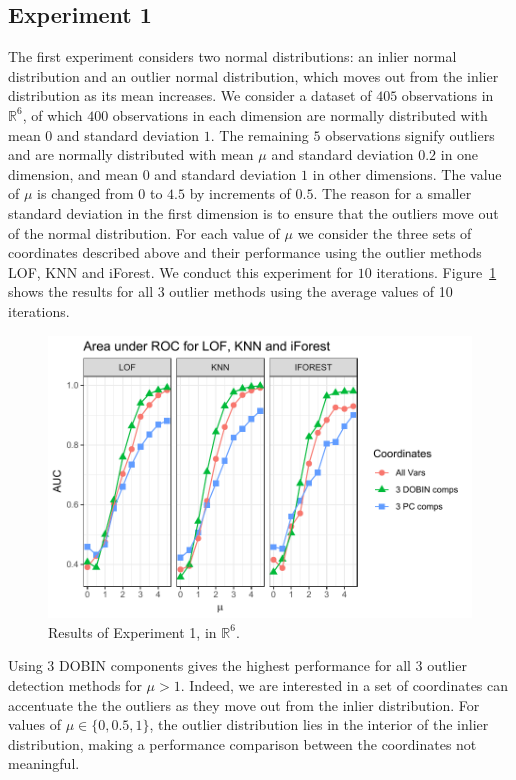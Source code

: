 \documentclass[11pt]{article}
\begin{document}
\subsection{Experiment 1}
The first experiment considers two normal distributions: an  inlier normal distribution and an outlier normal distribution, which moves out from the inlier distribution as its mean increases. We consider a dataset of $405$ observations in $\mathbb{R}^6$, of which $400$ observations in each dimension are normally distributed with mean $0$ and standard deviation $1$. The remaining $5$ observations signify outliers and are normally distributed with mean $\mu$ and standard deviation $0.2$ in one dimension, and mean $0$ and standard deviation $1$ in other dimensions. The value of $\mu$ is changed from $0$ to $4.5$ by increments of $0.5$. The reason for a smaller standard deviation in the first dimension is to ensure that the outliers move out of the normal distribution. For each value of $\mu$ we consider the three sets of coordinates described above and their performance using the outlier methods LOF, KNN and iForest.  We conduct this experiment for $10$ iterations. Figure~\ref{fig:Exp1} shows the results for all $3$  outlier methods using the average values of  10 iterations. 

\begin{figure}
	\centering
	\includegraphics[scale=0.8]{Exp1.pdf}
	\caption{Results of Experiment 1, in $\mathbb{R}^6$.}
	\label{fig:Exp1}
\end{figure} 

Using $3$ DOBIN components gives the highest performance for all $3$ outlier detection methods for $\mu > 1$.  Indeed, we are interested in a set of coordinates can accentuate the the outliers as they move out from the inlier distribution.  For values of $\mu \in \{0, 0.5, 1\}$,  the outlier distribution lies in the interior of the inlier distribution, making a performance comparison between the coordinates not meaningful.   
\end{document}
